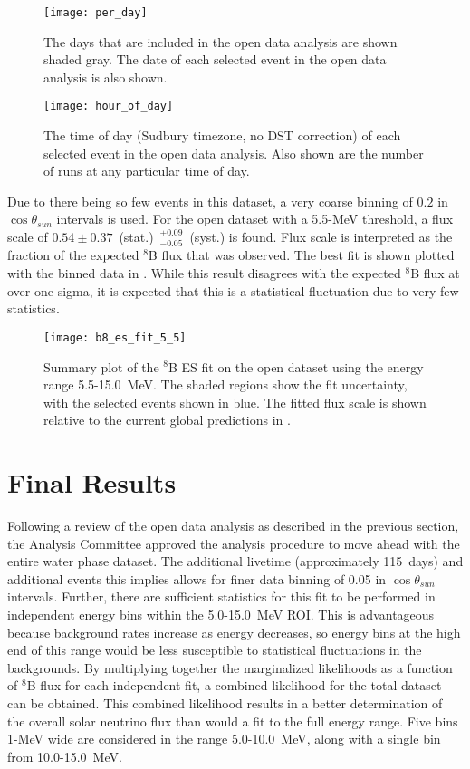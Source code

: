\begin{figure}
\centering
\texttt{[image: per\_day]}
\caption{The {\snop} days that are included in the open data analysis are shown
         shaded gray.
         The date of each selected event in the open data analysis is also shown.}
\label{fig:solar:opendata}
\end{figure}


\begin{figure}
\centering
\texttt{[image: hour\_of\_day]}
\caption{The time of day (Sudbury timezone, no DST correction) of each selected
         event in the open data analysis.
         Also shown are the number of runs at any particular time of day.}
\label{fig:solar:tod}
\end{figure}


Due to there being so few events in this dataset, a very coarse binning of $0.2$ in $\cos{\theta_{sun}}$ intervals is used.
For the open dataset with a 5.5-MeV threshold, a flux scale of $0.54 \pm 0.37$~(stat.)~$^{+0.09}_{-0.05}$~(syst.) is found.
Flux scale is interpreted as the fraction of the expected $^8$B flux that was observed.
The best fit is shown plotted with the binned data in .
While this result disagrees with the expected $^8$B flux at over one sigma, it is expected that this is a statistical fluctuation due to very few statistics.

\begin{figure}
\centering
\texttt{[image: b8\_es\_fit\_5\_5]}
\caption{
Summary plot of the $^8$B ES fit on the open dataset using the energy range 5.5-15.0~MeV.
The shaded regions show the fit uncertainty, with the selected events shown in blue.
The fitted flux scale is shown relative to the current global predictions in \cite{GlobalSolarFlux}.
}
\label{fig:solar:open55}
\end{figure}

\section{Final Results}
\label{sec:solar:updated}

Following a review of the open data analysis as described in the previous section, the {\snop} Analysis Committee approved the analysis procedure to move ahead with the entire {\snop} water phase dataset.
The additional livetime (approximately 115~days) and additional events this implies allows for finer data binning of 0.05 in $\cos{\theta_{sun}}$ intervals.
Further, there are sufficient statistics for this fit to be performed in independent energy bins within the 5.0-15.0~MeV ROI.
This is advantageous because background rates increase as energy decreases, so energy bins at the high end of this range would be less susceptible to statistical fluctuations in the backgrounds.
By multiplying together the marginalized likelihoods as a function of $^8$B flux for each independent fit, a combined likelihood for the total dataset can be obtained.
This combined likelihood results in a better determination of the overall solar neutrino flux than would a fit to the full energy range.
Five bins 1-MeV wide are considered in the range 5.0-10.0~MeV, along with a single bin from 10.0-15.0~MeV.

